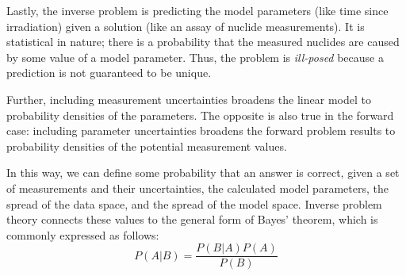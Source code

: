 Lastly, the inverse problem is predicting the model parameters (like time since
irradiation) given a solution (like an assay of nuclide measurements).  It is
statistical in nature; there is a probability that the measured nuclides are
caused by some value of a model parameter. Thus, the problem is
\textit{ill-posed} because a prediction is not guaranteed to be unique. 

\cite{inverse_select}
\cite{inverse_compare}

Further, including measurement uncertainties broadens the linear model to
probability densities of the parameters. The opposite is also true in the
forward case: including parameter uncertainties broadens the forward problem
results to probability densities of the potential measurement values.
\cite{inverse_theory}

In this way, we can define some probability that an answer is correct, given a
set of measurements and their uncertainties, the calculated model parameters,
the spread of the data space, and the spread of the model space. Inverse
problem theory connects these values to the general form of Bayes' theorem,
which is commonly expressed as follows:
\begin{equation}
  \label{eq:bayes}
  P(A|B) = \frac{P(B|A)P(A)}{P(B)}
\end{equation}


